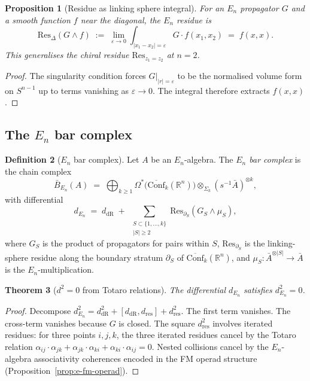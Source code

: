 \documentclass[11pt,reqno]{amsart}
\newtheorem{theorem}{Theorem}[section]
\newtheorem{proposition}[theorem]{Proposition}
\theoremstyle{definition}
\newtheorem{definition}[theorem]{Definition}
\theoremstyle{remark}
\providecommand{\Conf}{\mathrm{Conf}}
\providecommand{\En}{E_n}
\providecommand{\barB}{\bar{B}}
\providecommand{\bR}{\mathbb{R}}
\providecommand{\Res}{\mathrm{Res}}
\begin{document}
\begin{proposition}[Residue as linking sphere integral]
\label{prop:e-linking-residue}
For an $\En$ propagator $G$ and a smooth function $f$ near the
diagonal, the $\En$ residue is
\[
\Res_\Delta(G \wedge f)
\;:=\;
\lim_{\varepsilon \to 0}
\int_{|x_1 - x_2| = \varepsilon} G \cdot f(x_1,x_2)
\;=\; f(x,x).
\]
This generalises the chiral residue $\Res_{z_1 = z_2}$ at $n = 2$.
\end{proposition}

\begin{proof}
The singularity condition forces $G|_{|r| = \varepsilon}$ to
be the normalised volume form on $S^{n-1}$ up to terms vanishing
as $\varepsilon \to 0$. The integral therefore extracts $f(x,x)$.
\end{proof}

\subsection{The $\En$ bar complex}

\begin{definition}[$\En$ bar complex]\label{def:e-en-bar}
Let $A$ be an $\En$-algebra. The \emph{$\En$ bar complex} is the
chain complex
\begin{equation}\label{eq:e-en-bar}
\barB_{\En}(A)
\;=\;
\bigoplus_{k \ge 1}
\Omega^*\!\bigl(\overline{\Conf}_k(\bR^n)\bigr)
\otimes_{\Sigma_k} (s^{-1}\bar{A})^{\otimes k},
\end{equation}
with differential
\begin{equation}\label{eq:e-en-bar-diff}
d_{\En}
\;=\; d_{\mathrm{dR}}
\;+\;
\sum_{\substack{S \subset \{1,\ldots,k\} \\ |S| \ge 2}}
\Res_{\partial_S}\!(G_S \wedge \mu_S),
\end{equation}
where $G_S$ is the product of propagators for pairs within $S$,
$\Res_{\partial_S}$ is the linking-sphere residue along the
boundary stratum $\partial_S$ of $\overline{\Conf}_k(\bR^n)$,
and $\mu_S \colon \bar{A}^{\otimes|S|} \to \bar{A}$ is the
$\En$-multiplication.
\end{definition}

\begin{theorem}[$d^2 = 0$ from Totaro relations]
\label{thm:e-d2-totaro}
The differential $d_{\En}$ satisfies $d_{\En}^2 = 0$.
\end{theorem}

\begin{proof}
Decompose $d_{\En}^2 = d_{\mathrm{dR}}^2
+ [d_{\mathrm{dR}}, d_{\mathrm{res}}] + d_{\mathrm{res}}^2$.
The first term vanishes. The cross-term vanishes because $G$ is
closed. The square $d_{\mathrm{res}}^2$ involves iterated
residues: for three points $i,j,k$, the three iterated residues
cancel by the Totaro relation
$\alpha_{ij}\cdot\alpha_{jk} + \alpha_{jk}\cdot\alpha_{ki}
+ \alpha_{ki}\cdot\alpha_{ij} = 0$. Nested collisions cancel by
the $\En$-algebra associativity coherences encoded in the FM
operad structure (Proposition~\ref{prop:e-fm-operad}).
\end{proof}
\end{document}
